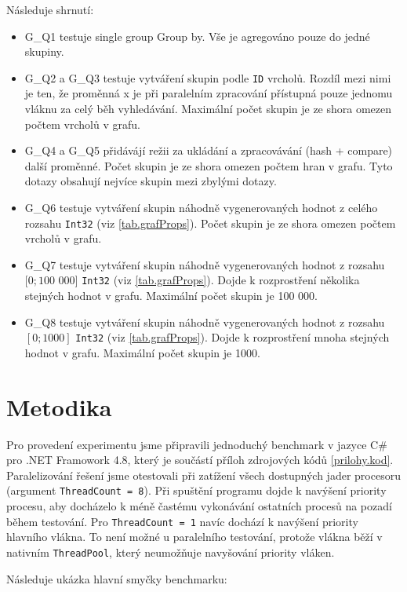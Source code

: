 Následuje shrnutí:
\begin{itemize}

\item G\_Q1 testuje single group Group by. Vše je agregováno pouze do jedné skupiny. 
\item G\_Q2 a G\_Q3  testuje vytváření skupin podle \verb+ID+ vrcholů. Rozdíl mezi nimi je ten, že proměnná x je při paralelním zpracování přístupná pouze jednomu vláknu za celý běh vyhledávání. Maximální počet skupin je ze shora omezen počtem vrcholů v grafu.
\item G\_Q4 a G\_Q5 přidávájí režii za ukládání a zpracovávání (hash + compare) další proměnné. Počet skupin je ze shora omezen počtem hran v grafu. Tyto dotazy obsahují nejvíce skupin mezi zbylými dotazy.
\item G\_Q6 testuje vytváření skupin náhodně vygenerovaných hodnot z celého rozsahu \verb+Int32+ (viz \ref{tab.grafProps}). Počet skupin je ze shora omezen počtem vrcholů v grafu.
\item G\_Q7 testuje vytváření skupin náhodně vygenerovaných hodnot z rozsahu $[0; 100$ $000]$ \verb+Int32+ (viz \ref{tab.grafProps}). Dojde k rozprostření několika stejných hodnot v grafu. Maximální počet skupin je 100 000.
\item G\_Q8  testuje vytváření skupin náhodně vygenerovaných hodnot z rozsahu $[0; 1000]$ \verb+Int32+ (viz \ref{tab.grafProps}). Dojde k rozprostření mnoha stejných hodnot v grafu. Maximální počet skupin je 1000.

\end{itemize}

\section{Metodika}
Pro provedení experimentu jsme připravili jednoduchý benchmark v jazyce C\# pro .NET Framowork 4.8, který je součástí příloh zdrojových kódů \ref{prilohy.kod}.
Paralelizování řešení jsme otestovali při zatížení všech dostupných jader procesoru (argument \verb+ThreadCount = 8+).
Při spuštění programu dojde k navýšení priority procesu, aby docházelo k méně častému vykonávání ostatních procesů na pozadí během testování. 
Pro \verb+ThreadCount = 1+ navíc dochází k navýšení priority hlavního vlákna. 
To není možné u paralelního testování, protože vlákna běží v nativním \verb+ThreadPool+, který neumožňuje navyšování priority vláken.

Následuje ukázka hlavní smyčky benchmarku:

